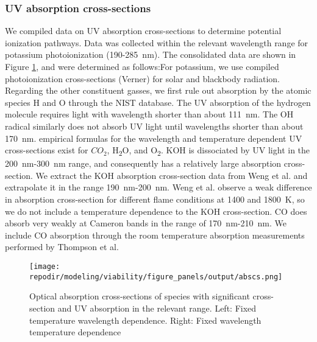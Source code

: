 \subsubsection{UV absorption cross-sections}

We compiled data on UV absorption cross-sections to determine potential ionization pathways. Data was collected within the relevant wavelength range for potassium photoionization (190-\SI{285}{\nano\meter}). The consolidated data are shown in Figure \ref{fig:SI_UV_abscs}, and were determined as follows:For potassium, we use compiled photoionization cross-sections (Verner) for solar and blackbody radiation.\cite{huebnerPhotoionizationPhotodissociationRates2015} Regarding the other constituent gasses, we first rule out absorption by the atomic species H and O through the NIST database.\cite{sansonettiHandbookBasicAtomic2005} The UV absorption of the hydrogen molecule requires light with wavelength shorter than about \SI{111}{\nano\meter}.\cite{franceFARULTRAVIOLETMOLECULARHYDROGEN} The OH radical similarly does not absorb UV light until wavelengths shorter than about \SI{170}{\nano\meter}.\cite{chipmanAbsorptionSpectrumOH2008} empirical formulas for the wavelength and temperature dependent UV cross-sections exist for $CO_2$\cite{oehlschlaegerUltravioletAbsorptionCrosssections2004}, H\textsubscript{2}O,\cite{zuevUVABSORPTIONCROSS} and O\textsubscript{2}.\cite{zuevUVABSORPTIONCROSS} KOH is dissociated by UV light in the \SI{200}{\nano\meter}-\SI{300}{\nano\meter} range, and consequently has a relatively large absorption cross-section. We extract the KOH absorption cross-section data from Weng et al. and extrapolate it in the range \SI{190}{\nano\meter}-\SI{200}{\nano\meter}.\cite{wengUltravioletAbsorptionCross2019} Weng et al. observe a weak difference in absorption cross-section for different flame conditions at 1400 and \SI{1800}{\kelvin}, so we do not include a temperature dependence to the KOH cross-section. CO does absorb very weakly at Cameron bands in the range of \SI{170}{\nano\meter}-\SI{210}{\nano\meter}. We include CO absorption through the room temperature absorption measurements performed by Thompson et al.\cite{thompsonUltravioletAbsorptionCoefficients1963} %


\begin{figure}[h]
    \centering
    \texttt{[image: \\repodir/modeling/viability/figure\_panels/output/abscs.png]} 
    \caption{Optical absorption cross-sections of species with significant cross-section and UV absorption in the relevant range. Left: Fixed temperature wavelength dependence. Right: Fixed wavelength temperature dependence}
    \label{fig:SI_UV_abscs}
\end{figure}


